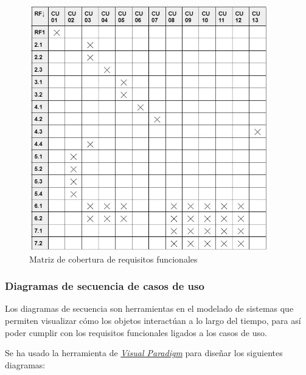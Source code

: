 \begin{figure}[H]
	\centering
	\includegraphics[width=0.93\textwidth]{imgs/matriz-requisitos.JPG}
	\caption{Matriz de cobertura de requisitos funcionales}
	\label{fig:matriz-requisitos}
\end{figure}

\newpage
\subsubsection{Diagramas de secuencia de casos de uso}

Los diagramas de secuencia son herramientas en el modelado de sistemas que permiten visualizar cómo los objetos interactúan a lo largo del tiempo, para así poder cumplir con los requisitos funcionales ligados a los casos de uso.

Se ha usado la herramienta de \href{https://www.visual-paradigm.com/}{\textit{Visual Paradigm}} para diseñar los siguientes diagramas:

